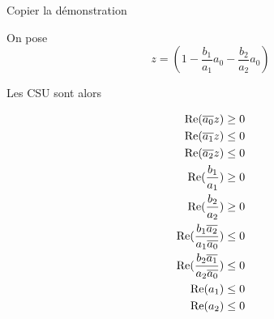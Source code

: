 			\begin{TODO}
			  Copier la démonstration
			\end{TODO}

			On pose
			\begin{equation}
				z = \left(1 - \frac{b_1}{a_1}a_0 - \frac{b_2}{a_2}a_0\right)
			\end{equation}

			Les CSU sont alors

			\begin{align}
				\operatorname{Re}({\overline{a_0}}z) \ge 0 \\
				\operatorname{Re}({\overline{a_1}}z) \le 0 \\
				\operatorname{Re}({\overline{a_2}}z) \le 0 \\
				\operatorname{Re}(\dfrac{b_1}{a_1}) \ge 0 \\
				\operatorname{Re}(\dfrac{b_2}{a_2}) \ge 0 \\
				\operatorname{Re}(\dfrac{b_1{\overline{a_2}}}{a_1{\overline{a_0}}}) \le 0 \\
				\operatorname{Re}(\dfrac{b_2{\overline{a_1}}}{a_2{\overline{a_0}}}) \le 0 \\
				\operatorname{Re}(a_1) \le 0 \\
				\operatorname{Re}(a_2) \le 0
			\end{align}